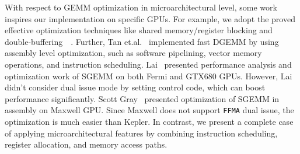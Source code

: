 With respect to GEMM optimization in microarchitectural level, some work inspires our implementation 
on specific GPUs. For example, we adopt the proved effective optimization techniques like shared memory/register 
blocking and double-buffering~\cite{volkov}~\cite{tan}. Further, Tan et.al.~\cite{tan} implemented fast DGEMM by using 
assembly level optimization, such as software pipelining, vector memory operations, and instruction scheduling. 
Lai~\cite{lai} presented performance analysis and optimization work of SGEMM on both Fermi and GTX680 GPUs. However, 
Lai didn't consider dual issue mode by setting control code, which can boost performance significantly. Scott 
Gray~\cite{nervana_sgemm_wiki} presented optimization of SGEMM in assembly on Maxwell GPU. Since Maxwell does not 
support {\tt FFMA} dual issue, the optimization is much easier than
Kepler. In contrast, we present a complete case of applying microarchitectural features by combining instruction 
scheduling, register allocation, and memory access paths. 
